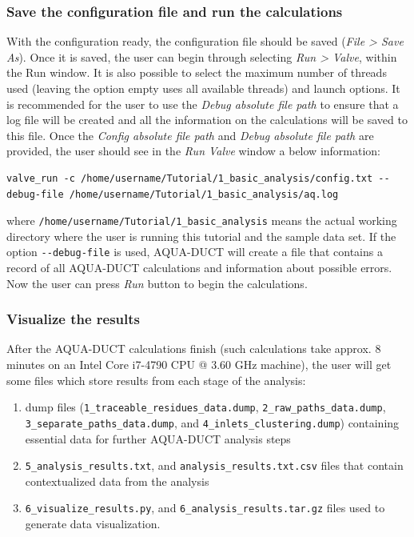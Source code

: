 \documentclass[9pt,tutorial]{livecoms}
\begin{document}
\subsubsection{Save the configuration file and run the calculations}
With the configuration ready, the configuration file should be saved (\emph{File > Save As}). Once it is saved, the user can begin through selecting \emph{Run > Valve}, within the Run window. It is also possible to select the maximum number of threads used (leaving the option empty uses all available threads) and launch options. It is recommended for the user to use the \textit{Debug absolute file path} to ensure that a log file will be created and all the information on the calculations will be saved to this file. Once the \textit{Config absolute file path} and \textit{Debug absolute file path} are provided, the user should see in the \textit{Run Valve} window a below information: 
\begin{lstlisting}
valve_run -c /home/username/Tutorial/1_basic_analysis/config.txt --debug-file /home/username/Tutorial/1_basic_analysis/aq.log
\end{lstlisting}
where \texttt{/home/username/Tutorial/1\_basic\_analysis} means the actual working directory where the user is running this tutorial and the sample data set.
If the option \texttt{-{}-debug-file} is used, AQUA-DUCT will create a file that contains a record of all AQUA-DUCT calculations and information about possible errors. 
Now the user can press \textit{Run} button to begin the calculations. 

\subsubsection{Visualize the results}
After the AQUA-DUCT calculations finish (such calculations take approx. 8 minutes on an Intel Core i7-4790 CPU @ 3.60 GHz machine), the user will get some files which store results from each stage of the analysis:

\begin{enumerate}
    \item dump files (\texttt{1\_traceable\_residues\_data.dump}, \texttt{2\_raw\_paths\_data.dump}, \texttt{3\_separate\_paths\_data.dump}, and \texttt{4\_inlets\_clustering.dump}) containing essential data for further AQUA-DUCT analysis steps
    \item \texttt{5\_analysis\_results.txt}, \hfill and \newline \texttt{analysis\_results.txt.csv} files that contain contextualized data from the analysis
    \item \texttt{6\_visualize\_results.py}, \hfill and \newline \texttt{6\_analysis\_results.tar.gz} files used to generate data visualization.
\end{enumerate}
\end{document}

